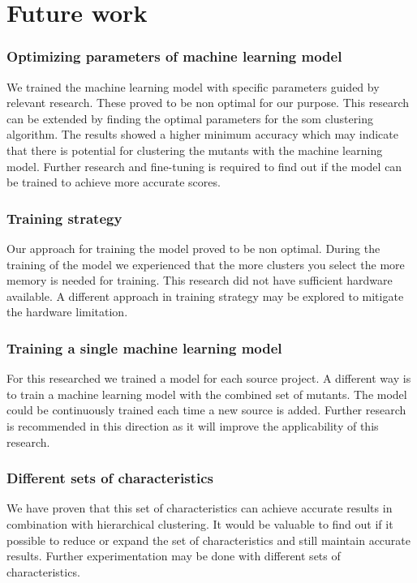 \documentclass[../main]{subfiles}
\begin{document}
\section{Future work}
\label{sec:future_work}
\subsubsection{Optimizing parameters of machine learning model}
We trained the machine learning model with specific parameters guided by relevant research. 
These proved to be non optimal for our purpose.
This research can be extended by finding the optimal parameters for the \acrshort{som} clustering algorithm.
The results showed a higher minimum accuracy which may indicate that there is potential for clustering the mutants with the machine learning model.
Further research and fine-tuning is required to find out if the model can be trained to achieve more accurate scores.

\subsubsection{Training strategy}
Our approach for training the model proved to be non optimal.
During the training of the model we experienced that the more clusters you select the more memory is needed for training.
This research did not have sufficient hardware available.
A different approach in training strategy may be explored to mitigate the hardware limitation.

\subsubsection{Training a single machine learning model}
For this researched we trained a model for each source project. 
A different way is to train a machine learning model with the combined set of mutants.
The model could be continuously trained each time a new source is added.
Further research is recommended in this direction as it will improve the applicability of this research.

\subsubsection{Different sets of characteristics}
We have proven that this set of characteristics can achieve accurate results in combination with hierarchical clustering.
It would be valuable to find out if it possible to reduce or expand the set of characteristics and still maintain accurate results.
Further experimentation may be done with different sets of characteristics.
\end{document}
